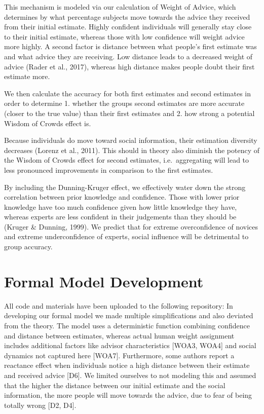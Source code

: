 \documentclass[
  man,floatsintext]{apa6}
\begin{document}
This mechanism is modeled via our calculation of Weight of Advice, which determines by what percentage subjects move towards the advice they received from their initial estimate. Highly confident individuals will generally stay close to their initial estimate, whereas those with low confidence will weight advice more highly. A second factor is distance between what people's first estimate was and what advice they are receiving. Low distance leads to a decreased weight of advice (Rader et al., 2017), whereas high distance makes people doubt their first estimate more.

We then calculate the accuracy for both first estimates and second estimates in order to determine 1. whether the groups second estimates are more accurate (closer to the true value) than their first estimates and 2. how strong a potential Wisdom of Crowds effect is.

Because individuals do move toward social information, their estimation diversity decreases (Lorenz et al., 2011). This should in theory also diminish the potency of the Wisdom of Crowds effect for second estimates, i.e.~aggregating will lead to less pronounced improvements in comparison to the first estimates.

By including the Dunning-Kruger effect, we effectively water down the strong correlation between prior knowledge and confidence. Those with lower prior knowledge have too much confidence given how little knowledge they have, whereas experts are less confident in their judgements than they should be (Kruger \& Dunning, 1999). We predict that for extreme overconfidence of novices and extreme underconfidence of experts, social influence will be detrimental to group accuracy.

\hypertarget{formal-model-development}{%
\section{Formal Model Development}\label{formal-model-development}}

All code and materials have been uploaded to the following repository:
In developing our formal model we made multiple simplifications and also deviated from the theory.
The model uses a deterministic function combining confidence and distance between estimates, whereas actual human weight assignment includes additional factors like advisor characteristics {[}WOA3, WOA4{]} and social dynamics not captured here {[}WOA7{]}.
Furthermore, some authors report a reactance effect when individuals notice a high distance between their estimate and received advice {[}D6{]}. We limited ourselves to not modeling this and assumed that the higher the distance between our initial estimate and the social information, the more people will move towards the advice, due to fear of being totally wrong {[}D2, D4{]}.
\end{document}
